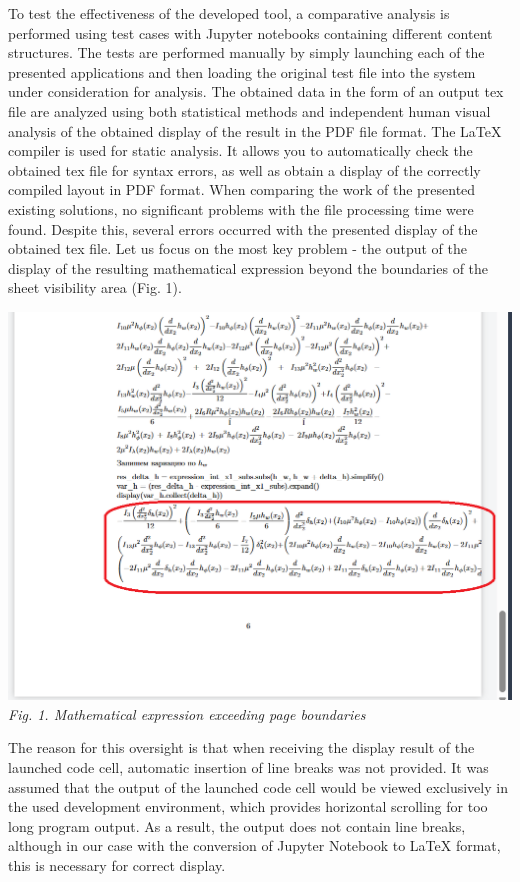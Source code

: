 \documentclass{article}
\begin{document}
\begin{multicols}{2}
To test the effectiveness of the developed tool, a comparative analysis is performed using test cases with Jupyter notebooks containing different content structures. The tests are performed manually by simply launching each of the presented applications and then loading the original test file into the system under consideration for analysis. The obtained data in the form of an output tex file are analyzed using both statistical methods and independent human visual analysis of the obtained display of the result in the PDF file format. The LaTeX compiler is used for static analysis. It allows you to automatically check the obtained tex file for syntax errors, as well as obtain a display of the correctly compiled layout in PDF format. When comparing the work of the presented existing solutions, no significant problems with the file processing time were found. Despite this, several errors occurred with the presented display of the obtained tex file. Let us focus on the most key problem - the output of the display of the resulting mathematical expression beyond the boundaries of the sheet visibility area (Fig. 1).\newline

\begin{minipage}[t]{0.9\linewidth}
    \raggedright
    \includegraphics[width=\linewidth, height=0.35\textheight]{fig_1.png}
    \textit{Fig. 1. Mathematical expression exceeding page boundaries\newline}
    \label{fig:math_overflow}
\end{minipage}


The reason for this oversight is that when receiving the display result of the launched code cell, automatic insertion of line breaks was not provided. It was assumed that the output of the launched code cell would be viewed exclusively in the used development environment, which provides horizontal scrolling for too long program output. As a result, the output does not contain line breaks, although in our case with the conversion of Jupyter Notebook to LaTeX format, this is necessary for correct display.


\end{multicols}
\end{document}
